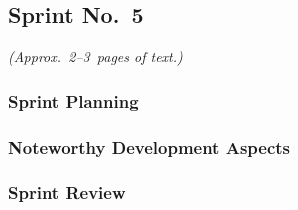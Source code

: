 
\subsection{Sprint No.~5}

\emph{(Approx.~2--3~pages of text.)}

\subsubsection*{Sprint Planning}

\subsubsection*{Noteworthy Development Aspects}

\subsubsection*{Sprint Review}


